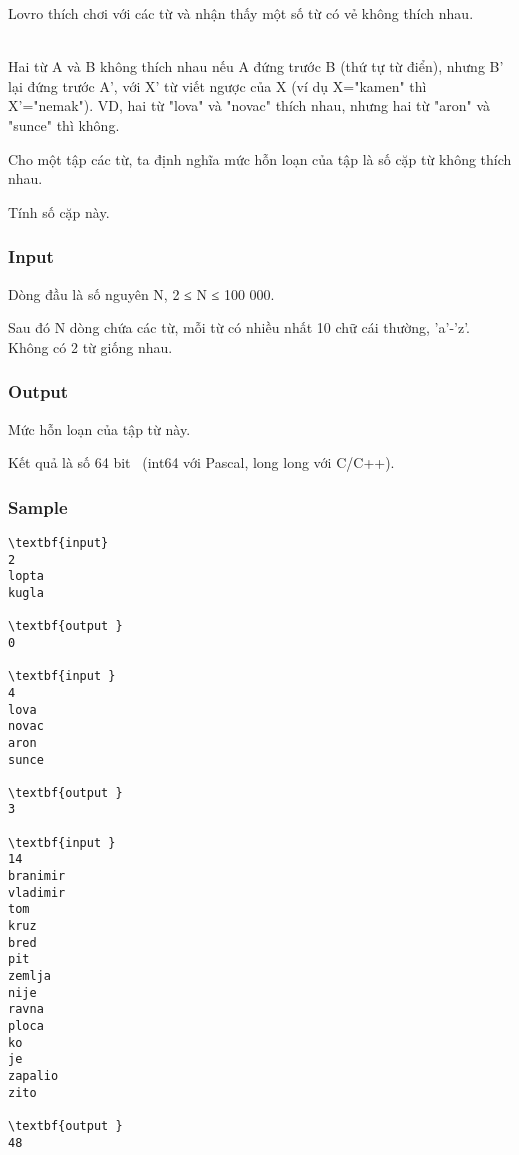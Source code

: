 

Lovro thích chơi với các từ và nhận thấy một số từ có vẻ không thích nhau.


\\Hai từ A và B không thích nhau nếu A đứng trước B (thứ tự từ điển), nhưng B' lại đứng trước A', với X' từ viết ngược của X (ví dụ X="kamen" thì X'="nemak"). VD, hai từ "lova" và "novac" thích nhau, nhưng hai từ "aron" và "sunce" thì không.

Cho một tập các từ, ta định nghĩa mức hỗn loạn của tập là số cặp từ không thích nhau.

Tính số cặp này.

\subsubsection{Input}

Dòng đầu là số nguyên N, 2 ≤ N ≤ 100 000.

Sau đó N dòng chứa các từ, mỗi từ có nhiều nhất 10 chữ cái thường, 'a'-'z'. Không có 2 từ giống nhau.

\subsubsection{Output}

Mức hỗn loạn của tập từ này.

Kết quả là số 64 bit  (int64 với Pascal, long long với C/C++).

\subsubsection{Sample}
\begin{verbatim}
\textbf{input}  
2 
lopta 
kugla 
 
\textbf{output }
0

\textbf{input } 
4 
lova 
novac 
aron 
sunce 
 
\textbf{output }
3

\textbf{input } 
14 
branimir 
vladimir 
tom 
kruz 
bred 
pit 
zemlja 
nije 
ravna 
ploca 
ko 
je 
zapalio 
zito 
 
\textbf{output } 
48
\end{verbatim}